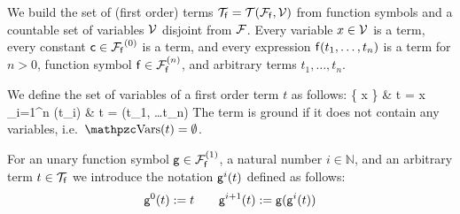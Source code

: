 
\begin{definition}\label{def:terms}
	We build the set of (first order) {\myem terms }$\mcTf = \mcTFfV$ 
	from function symbols and a
	countable set of {\myem variables }$\mcV$ disjoint from $\mcF$\!.
	Every variable $x\in\mcV$ is a term,
	every {\myem constant} $\mc\in\mcFf^{(0)}$ is a term, 
	and every expression $\mf(t_1,\ldots,t_n)$ is a term
	for $n>0$, function symbol $\mf\in\mcFfn$,  
	and arbitrary terms $t_1,\ldots,t_n$.
\end{definition}

\begin{definition}\label{def:term:vars}\label{def:term:ground}
	We define the set of variables of a first order term $t$ as follows:
	 {
		\{ x \} &  t = x \in \mcV \\
		\bigcup_{i=1}^n \var(t_i) &   t = \mf(t_1, \ldots t_n)
	}
	The term is {\myem ground} if it does not contain any variables, i.e.~$\var(t) = \emptyset$.
\end{definition}

\begin{definition}
	For an unary function symbol $\mg\in\mcFfn[1]$, a natural number
	$i\in\mathbb{N}$, and an arbitrary term $t\in\mcTf$ we introduce the notation $\mg^i(t)$ defined as follows:
	\[
	\mg^0(t) := t \qquad
	\mg^{i+1}(t) := \mg(\mg^i(t))
	\]
\end{definition}

